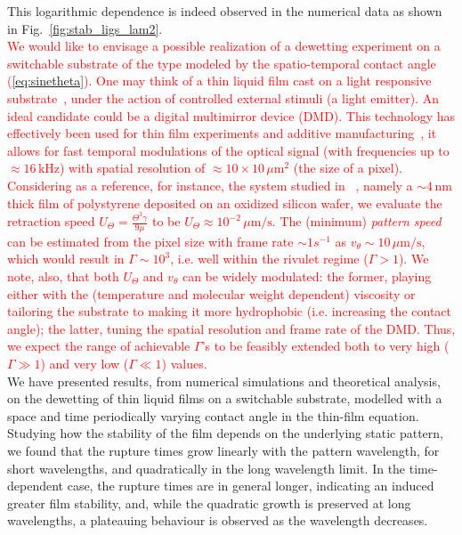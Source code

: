 \documentclass[twocolumn,amsmath,amssymb,showpacs,prl,superscriptaddress]{revtex4-1} %
\begin{document}
This logarithmic dependence is indeed observed in the numerical data as shown in Fig.~\ref{fig:stab_ligs_lam2}.\\
\textcolor{red}{We would like to envisage a possible realization of a 
dewetting experiment on a switchable substrate of the type modeled by the spatio-temporal 
contact angle (\ref{eq:sinetheta}). One may think of a thin liquid film cast on a light responsive substrate~\cite{IchimuraEtAl_Science2000}, under the action of controlled 
external stimuli (a light emitter). 
An ideal candidate could be a digital multimirror device (DMD).
This technology has effectively been used for thin film experiments and additive manufacturing~\cite{doi:10.1021/jp301092y, doi:10.1126/science.aax8760}, it allows for fast temporal modulations of the optical signal (with frequencies up to $\approx 16 \, \text{kHz}$)
with spatial resolution of $\approx 10 \times 10 \, \mu \text{m}^2$ (the size of a pixel).
Considering as a reference, for instance, the system studied in ~\cite{becker2003complex,PhysRevLett.99.114503}, namely a $\sim 4 \, \text{nm}$ thick film 
of polystyrene deposited on an oxidized silicon wafer,  
we evaluate the retraction speed 
$U_{\Theta} = \frac{\Theta^3 \gamma}{9 \mu}$ to be 
$U_{\Theta} \approx 10^{-2} \, \mu \text{m}/\text{s}$. 
The (minimum) {\it pattern speed} can be 
estimated from the pixel size with frame rate $\sim 1 s^{-1}$ as 
$v_{\theta} \sim 10 \, \mu \text{m}/\text{s}$, which  would result in $\Gamma \sim 10^3$, i.e. well within the rivulet regime ($\Gamma > 1$). We note, also, that both $U_{\Theta}$ and $v_{\theta}$ can be widely modulated: the former, playing either with the (temperature and molecular weight dependent) viscosity 
or tailoring the substrate to making it more hydrophobic (i.e. increasing the contact angle); the latter, tuning
the spatial resolution and frame rate of the DMD. Thus, we expect the range of achievable $\Gamma$'s to 
be feasibly extended both to very high ($\Gamma \gg 1$) and very low ($\Gamma \ll 1$) values.}\\
We have presented results, from numerical simulations and theoretical analysis, on the dewetting of thin liquid films on a switchable substrate, modelled with a space and time periodically varying contact angle in the thin-film equation.
Studying how the stability of the film depends on the underlying static pattern, we found that the rupture times grow linearly with the pattern wavelength, for short wavelengths, and quadratically in the long wavelength limit. 
In the time-dependent case, the rupture times are in general longer, indicating an induced greater film stability, and, while the quadratic growth is preserved at long wavelengths, a plateauing behaviour is observed as the wavelength decreases. 
\end{document}
